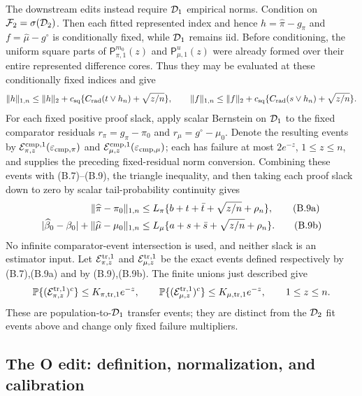 The downstream edits instead require \(\mathcal D_1\) empirical norms.  Condition on
\(\mathcal F_2=\sigma(\mathcal D_2)\).  Then each fitted represented index and hence
\(h=\widehat\pi-g_\pi\) and \(f=\widehat\mu-g^\circ\) is conditionally fixed,
while \(\mathcal D_1\) remains iid.  Before conditioning, the uniform square parts of
\(\mathsf P_{\pi,1}^{m_0}(z)\) and
\(\mathsf P_{\mu,1}^{u}(z)\) were already formed over their entire represented
difference cores.  Thus they may be evaluated at these conditionally fixed
indices and give
\[
 \lVert h\rVert_{1,n}\le\lVert h\rVert_2+c_{\rm sq}
   \{C_{\rm rad}(t\vee h_n)+\sqrt{z/n}\},\qquad
 \lVert f\rVert_{1,n}\le\lVert f\rVert_2+c_{\rm sq}
   \{C_{\rm rad}(s\vee h_n)+\sqrt{z/n}\}.
\]
For each fixed positive proof slack, apply scalar Bernstein on \(\mathcal D_1\) to
the fixed comparator residuals \(r_\pi=g_\pi-\pi_0\) and
\(r_\mu=g^\circ-\mu_0\).  Denote the resulting events by
\(\mathcal E_{\pi,z}^{\rm cmp,1}(\varepsilon_{\rm cmp,\pi})\) and
\(\mathcal E_{\mu,z}^{\rm cmp,1}(\varepsilon_{\rm cmp,\mu})\); each has
failure at most \(2e^{-z}\), \(1\le z\le n\), and supplies the preceding
fixed-residual norm conversion.  Combining these events with (B.7)--(B.9),
the triangle inequality, and then taking each proof slack down to zero by
scalar tail-probability continuity gives
\begin{align}
 \lVert \widehat\pi-\pi_0\rVert_{1,n}
 &\le L_\pi\{b+t+\bar t+\sqrt{z/n}+\rho_n\},\tag{B.9a}\\
 |\widehat\beta_0-\beta_0|+
 \lVert \widehat\mu-\mu_0\rVert_{1,n}
 &\le L_\mu\{a+s+\bar s+\sqrt{z/n}+\rho_n\}.
 \tag{B.9b}
\end{align}
No infinite comparator-event intersection is used, and neither slack is an
estimator input.  Let \(\mathcal E_{\pi,z}^{\rm tr,1}\) and
\(\mathcal E_{\mu,z}^{\rm tr,1}\) be the exact events defined respectively
by (B.7),(B.9a) and by (B.9),(B.9b).  The finite unions just described give
\[
 \mathbb P\{(\mathcal E_{\pi,z}^{\rm tr,1})^c\}
 \le K_{\pi,\rm tr,1}e^{-z},\qquad
 \mathbb P\{(\mathcal E_{\mu,z}^{\rm tr,1})^c\}
 \le K_{\mu,\rm tr,1}e^{-z},\qquad 1\le z\le n.
\]
These are population-to-\(\mathcal D_1\) transfer events; they are distinct from
the \(\mathcal D_2\) fit events above and change only fixed failure multipliers.

\subsection{The O edit: definition, normalization, and calibration}
\label{app:upper-o-calibration}

